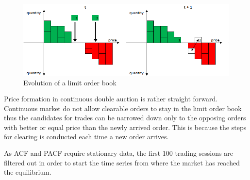 \begin{figure}
    \begin{center}  
        \includegraphics[width=15cm]{diagrams/lob_evolution.png}
        \caption{Evolution of a limit order book}
        \label{fig:lob_evo}
    \end{center}
\end{figure}

Price formation in continuous double auction is rather straight forward. Continuous
market do not allow clearable orders to stay in the limit order book thus the
candidates for trades can be narrowed down only to the opposing orders with better
or equal price than the newly arrived order. This is because the steps for 
clearing is conducted each time a new order arrives.



As ACF and PACF require stationary data, the 
first 100 trading sessions are filtered out in order to start the time series from where
the market has reached the equilibrium.